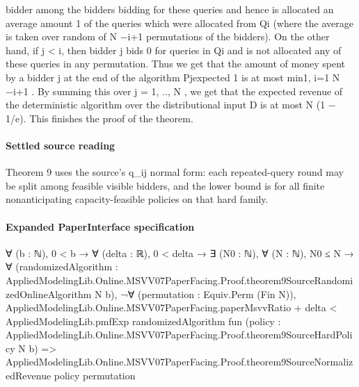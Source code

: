 \documentclass[10pt]{article}
\begin{document}
\begin{ReviewVerbatim}
bidder among the bidders bidding for these queries and hence is allocated an average amount
1
of the queries which were allocated from Qi (where the average is taken over random
of N −i+1
permutations of the bidders). On the other hand, if j < i, then bidder j bids 0 for queries in
Qi and is not allocated any of these queries in any permutation.
Thus we get that the
amount of money spent by a bidder j at the end of the algorithm
Pjexpected
1
is at most min{1, i=1 N −i+1 }. By summing this over j = 1, .., N , we get that the expected
revenue of the deterministic algorithm over the distributional input D is at most N (1 − 1/e).
This finishes the proof of the theorem.
\end{ReviewVerbatim}

\paragraph{Settled source reading}
\begin{sloppypar}
Theorem 9 uses the source's q\_\allowbreak{}ij normal form:\allowbreak{} each repeated-\allowbreak{}query round may be split among feasible visible bidders, and the lower bound is for all finite nonanticipating capacity-\allowbreak{}feasible policies on that hard family.\allowbreak{}
\end{sloppypar}

\paragraph{Expanded PaperInterface specification}
\begin{ReviewVerbatim}
∀ (b : ℕ),
  0 < b →
    ∀ (delta : ℝ),
      0 < delta →
        ∃ (N0 : ℕ),
          ∀ (N : ℕ),
            N0 ≤ N →
              ∀
                (randomizedAlgorithm :
                  AppliedModelingLib.Online.MSVV07PaperFacing.Proof.theorem9SourceRandomizedOnlineAlgorithm N b),
                ¬∀ (permutation : Equiv.Perm (Fin N)),
                    AppliedModelingLib.Online.MSVV07PaperFacing.paperMsvvRatio + delta <
                      AppliedModelingLib.pmfExp randomizedAlgorithm
                        fun (policy : AppliedModelingLib.Online.MSVV07PaperFacing.Proof.theorem9SourceHardPolicy N b) =>
                        AppliedModelingLib.Online.MSVV07PaperFacing.Proof.theorem9SourceNormalizedRevenue policy
                          permutation
\end{ReviewVerbatim}
\end{document}
